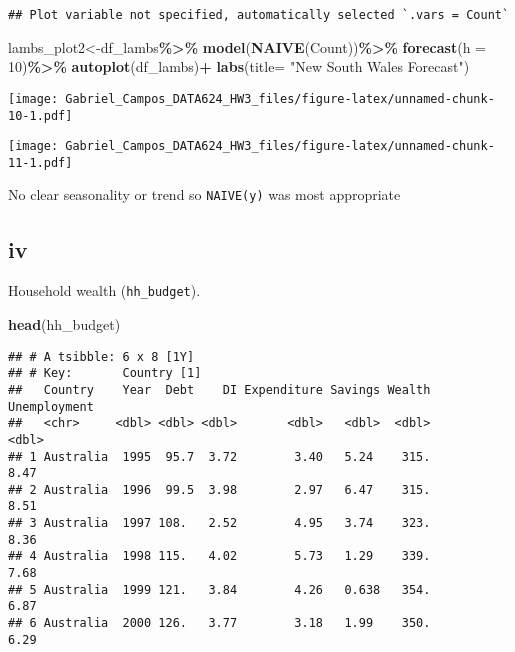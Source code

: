 \documentclass[
]{article}
\newenvironment{Shaded}{\begin{snugshade}}{\end{snugshade}}
\newcommand{\AttributeTok}[1]{\textcolor[rgb]{0.13,0.29,0.53}{#1}}
\newcommand{\DecValTok}[1]{\textcolor[rgb]{0.00,0.00,0.81}{#1}}
\newcommand{\FunctionTok}[1]{\textcolor[rgb]{0.13,0.29,0.53}{\textbf{#1}}}
\newcommand{\NormalTok}[1]{#1}
\newcommand{\OtherTok}[1]{\textcolor[rgb]{0.56,0.35,0.01}{#1}}
\newcommand{\SpecialCharTok}[1]{\textcolor[rgb]{0.81,0.36,0.00}{\textbf{#1}}}
\newcommand{\StringTok}[1]{\textcolor[rgb]{0.31,0.60,0.02}{#1}}
\begin{document}
\begin{verbatim}
## Plot variable not specified, automatically selected `.vars = Count`
\end{verbatim}

\begin{Shaded}
\begin{Highlighting}[]
\NormalTok{lambs\_plot2}\OtherTok{\textless{}{-}}\NormalTok{df\_lambs}\SpecialCharTok{\%\textgreater{}\%}
   \FunctionTok{model}\NormalTok{(}\FunctionTok{NAIVE}\NormalTok{(Count))}\SpecialCharTok{\%\textgreater{}\%}
     \FunctionTok{forecast}\NormalTok{(}\AttributeTok{h =} \DecValTok{10}\NormalTok{)}\SpecialCharTok{\%\textgreater{}\%}
       \FunctionTok{autoplot}\NormalTok{(df\_lambs)}\SpecialCharTok{+}
   \FunctionTok{labs}\NormalTok{(}\AttributeTok{title=} \StringTok{"New South Wales Forecast"}\NormalTok{)}
\end{Highlighting}
\end{Shaded}

\texttt{[image: Gabriel\_Campos\_DATA624\_HW3\_files/figure-latex/unnamed-chunk-10-1.pdf]}

\texttt{[image: Gabriel\_Campos\_DATA624\_HW3\_files/figure-latex/unnamed-chunk-11-1.pdf]}

No clear seasonality or trend so \texttt{NAIVE(y)} was most appropriate

\hypertarget{iv}{%
\subsection{iv}\label{iv}}

Household wealth (\texttt{hh\_budget}).

\begin{Shaded}
\begin{Highlighting}[]
\FunctionTok{head}\NormalTok{(hh\_budget)}
\end{Highlighting}
\end{Shaded}

\begin{verbatim}
## # A tsibble: 6 x 8 [1Y]
## # Key:       Country [1]
##   Country    Year  Debt    DI Expenditure Savings Wealth Unemployment
##   <chr>     <dbl> <dbl> <dbl>       <dbl>   <dbl>  <dbl>        <dbl>
## 1 Australia  1995  95.7  3.72        3.40   5.24    315.         8.47
## 2 Australia  1996  99.5  3.98        2.97   6.47    315.         8.51
## 3 Australia  1997 108.   2.52        4.95   3.74    323.         8.36
## 4 Australia  1998 115.   4.02        5.73   1.29    339.         7.68
## 5 Australia  1999 121.   3.84        4.26   0.638   354.         6.87
## 6 Australia  2000 126.   3.77        3.18   1.99    350.         6.29
\end{verbatim}
\end{document}
